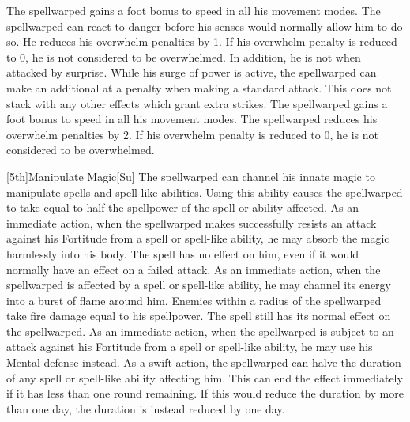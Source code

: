         The spellwarped gains a  foot bonus to speed in all his movement modes.
        The spellwarped can react to danger before his senses would normally allow him to do so.
        He reduces his overwhelm penalties by 1.
        If his overwhelm penalty is reduced to 0, he is not considered to be overwhelmed.
        In addition, he is not \unaware when attacked by surprise.
        While his surge of power is active, the spellwarped can make an additional  at a  penalty when making a standard attack.
        This does not stack with any other effects which grant extra strikes.
        The spellwarped gains a  foot bonus to speed in all his movement modes.
        The spellwarped reduces his overwhelm penalties by 2.
        If his overwhelm penalty is reduced to 0, he is not considered to be overwhelmed.

        [5th]{Manipulate Magic}[Su]
        The spellwarped can channel his innate magic to manipulate spells and spell-like abilities.
        Using this ability causes the spellwarped to take  equal to half the spellpower of the spell or ability affected.
        As an immediate action, when the spellwarped makes successfully resists an attack against his Fortitude from a spell or spell-like ability, he may absorb the magic harmlessly into his body.
        The spell has no effect on him, even if it would normally have an effect on a failed attack.
        As an immediate action, when the spellwarped is affected by a spell or spell-like ability, he may channel its energy into a burst of flame around him.
        Enemies within a \areamed radius of the spellwarped take fire damage equal to his spellpower.
        The spell still has its normal effect on the spellwarped.
        As an immediate action, when the spellwarped is subject to an attack against his Fortitude from a spell or spell-like ability, he may use his Mental defense instead.
        As a swift action, the spellwarped can halve the duration of any spell or spell-like ability affecting him.
        This can end the effect immediately if it has less than one round remaining.
        If this would reduce the duration by more than one day, the duration is instead reduced by one day.

